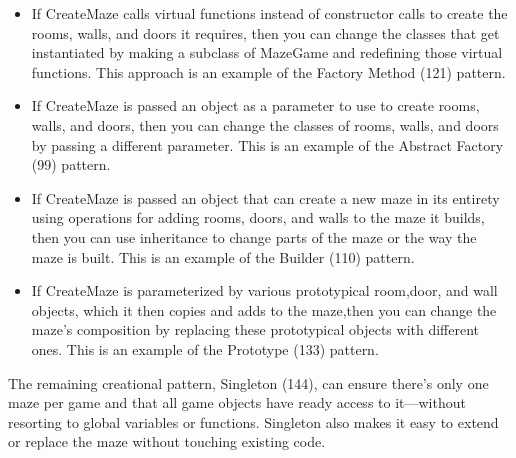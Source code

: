 \documentclass{report}
\begin{document}
\begin{itemize}
            \begin{itemize}
                \item If CreateMaze calls virtual functions instead of constructor calls to create the rooms, walls, and doors it requires, then you can change the classes that get instantiated by making a subclass of MazeGame and redefining those virtual functions. This approach is an example of the Factory Method (121) pattern.
                \item If CreateMaze is passed an object as a parameter to use to create rooms, walls, and doors, then you can change the classes of rooms, walls, and doors by passing a different parameter. This is an example of the Abstract Factory (99) pattern.
                \item If CreateMaze is passed an object that can create a new maze in its entirety using operations for adding rooms, doors, and walls to the maze it builds, then you can use inheritance to change parts of the maze or the way the maze is built. This is an example of the Builder (110) pattern.
                \item If CreateMaze is parameterized by various prototypical room,door, and wall objects, which it then copies and adds to the maze,then you can change the maze's composition by replacing these prototypical objects with different ones. This is an example of the Prototype (133) pattern.
            \end{itemize}
            The remaining creational pattern, Singleton (144), can ensure there's only one maze per game and that all game objects have ready access to it—without resorting to global variables or functions. Singleton also makes it easy to extend or replace the maze without touching existing code.
        \end{itemize}

        \pagebreak 
\end{document}
